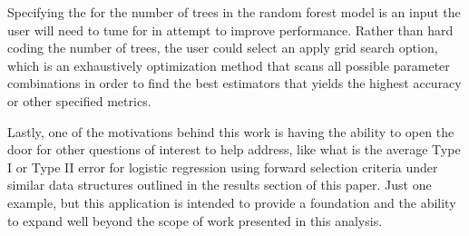 \documentclass{llncs}
\begin{document}
Specifying the for the number of trees in the random forest model is an input the user will need to tune for in attempt to improve performance. Rather than hard coding the number of trees, the user could select an apply grid search option, which is an exhaustively optimization method that scans all possible parameter combinations in order to find the best estimators that yields the highest accuracy or other specified metrics. 

Lastly, one of the motivations behind this work is having the ability to open the door for other questions of interest to help address, like what is the average Type I or Type II error for logistic regression using forward selection criteria under similar data structures outlined in the results section of this paper. Just one example, but this application is intended to provide a foundation and the ability to expand well beyond the scope of work presented in this analysis.
\end{document}
